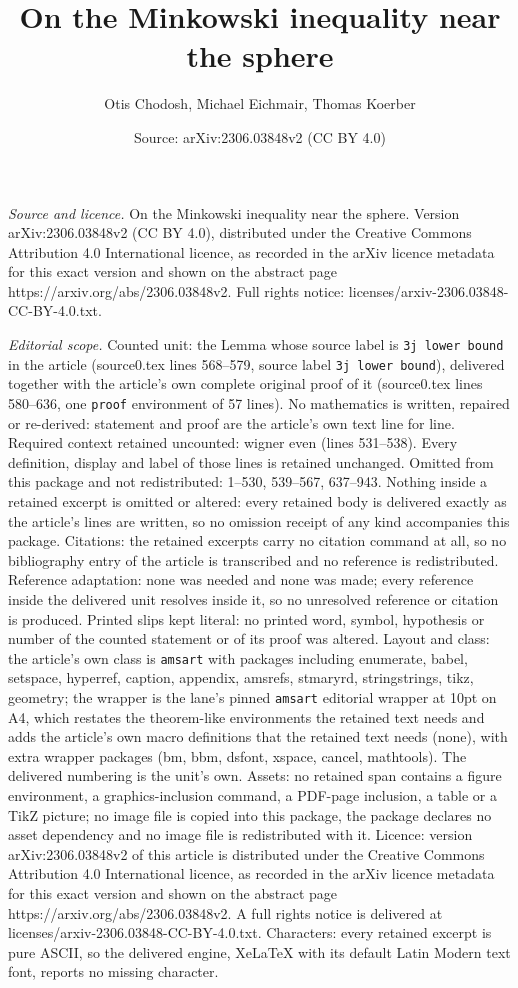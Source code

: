 \documentclass[10pt,a4paper]{amsart}
\title[On the Minkowski inequality near the sphere]{On the Minkowski inequality near the sphere}
\author{Otis Chodosh, Michael Eichmair, Thomas Koerber}
\date{Source: arXiv:2306.03848v2 (CC BY 4.0)}
\begin{document}
\maketitle

\noindent\emph{Source and licence.} On the Minkowski inequality near the sphere. Version arXiv:2306.03848v2 (CC BY 4.0), distributed under the Creative Commons Attribution 4.0 International licence, as recorded in the arXiv licence metadata for this exact version and shown on the abstract page https://arxiv.org/abs/2306.03848v2. Full rights notice: licenses/arxiv-2306.03848-CC-BY-4.0.txt.\par\smallskip

\noindent\textit{Editorial scope.} Counted unit: the Lemma whose source label is \texttt{3j lower bound} in the article (source0.tex lines 568--579, source label \texttt{3j lower bound}), delivered together with the article's own complete original proof of it (source0.tex lines 580--636, one \texttt{proof} environment of 57 lines). No mathematics is written, repaired or re-derived: statement and proof are the article's own text line for line. Required context retained uncounted: wigner even (lines 531--538). Every definition, display and label of those lines is retained unchanged. Omitted from this package and not redistributed: 1--530, 539--567, 637--943. Nothing inside a retained excerpt is omitted or altered: every retained body is delivered exactly as the article's lines are written, so no omission receipt of any kind accompanies this package. Citations: the retained excerpts carry no citation command at all, so no bibliography entry of the article is transcribed and no reference is redistributed. Reference adaptation: none was needed and none was made; every reference inside the delivered unit resolves inside it, so no unresolved reference or citation is produced. Printed slips kept literal: no printed word, symbol, hypothesis or number of the counted statement or of its proof was altered. Layout and class: the article's own class is \texttt{amsart} with packages including enumerate, babel, setspace, hyperref, caption, appendix, amsrefs, stmaryrd, stringstrings, tikz, geometry; the wrapper is the lane's pinned \texttt{amsart} editorial wrapper at 10pt on A4, which restates the theorem-like environments the retained text needs and adds the article's own macro definitions that the retained text needs (none), with extra wrapper packages (bm, bbm, dsfont, xspace, cancel, mathtools). The delivered numbering is the unit's own. Assets: no retained span contains a figure environment, a graphics-inclusion command, a PDF-page inclusion, a table or a TikZ picture; no image file is copied into this package, the package declares no asset dependency and no image file is redistributed with it. Licence: version arXiv:2306.03848v2 of this article is distributed under the Creative Commons Attribution 4.0 International licence, as recorded in the arXiv licence metadata for this exact version and shown on the abstract page https://arxiv.org/abs/2306.03848v2. A full rights notice is delivered at licenses/arxiv-2306.03848-CC-BY-4.0.txt. Characters: every retained excerpt is pure ASCII, so the delivered engine, XeLaTeX with its default Latin Modern text font, reports no missing character.
\end{document}
